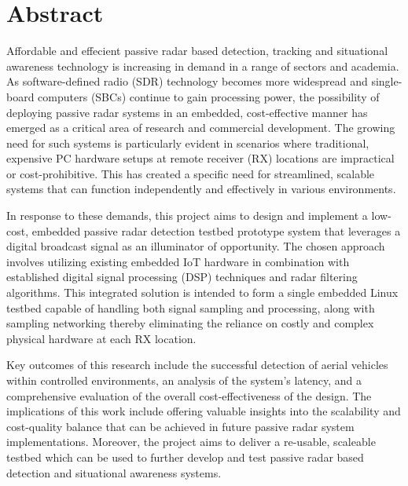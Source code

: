 \chapter*{Abstract \label{sec:abstract}}



Affordable and effecient passive radar based detection, tracking and situational awareness technology is increasing in demand in a range of sectors and academia. As software-defined radio (SDR) technology becomes more widespread and single-board computers (SBCs) continue to gain processing power, the possibility of deploying passive radar systems in an embedded, cost-effective manner has emerged as a critical area of research and commercial development. The growing need for such systems is particularly evident in scenarios where traditional, expensive PC hardware setups at remote receiver (RX) locations are impractical or cost-prohibitive. This has created a specific need for streamlined, scalable systems that can function independently and effectively in various environments.

In response to these demands, this project aims to design and implement a low-cost, embedded passive radar detection testbed prototype system that leverages a digital broadcast signal as an illuminator of opportunity. The chosen approach involves utilizing existing embedded IoT hardware in combination with established digital signal processing (DSP) techniques and radar filtering algorithms. This integrated solution is intended to form a single embedded Linux testbed capable of handling both signal sampling and processing, along with sampling networking thereby eliminating the reliance on costly and complex physical hardware at each RX location.

Key outcomes of this research include the successful detection of aerial vehicles within controlled environments, an analysis of the system's latency, and a comprehensive evaluation of the overall cost-effectiveness of the design. The implications of this work include offering valuable insights into the scalability and cost-quality balance that can be achieved in future passive radar system implementations. Moreover, the project aims to deliver a re-usable, scaleable testbed which can be used to further develop and test passive radar based detection and situational awareness systems.



